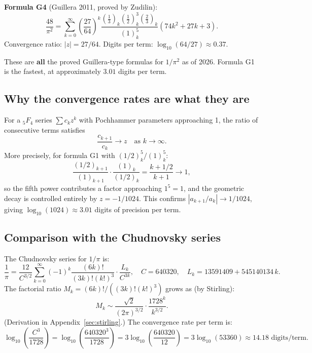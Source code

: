 \documentclass[11pt]{article}
\begin{document}
\medskip

\noindent\textbf{Formula G4} (Guillera 2011, proved by Zudilin):
\begin{equation}\label{eq:G4}
\frac{48}{\pi^2} = \sum_{k=0}^{\infty} \left(\frac{27}{64}\right)^k \frac{(\tfrac{1}{3})_k(\tfrac{1}{2})_k^3(\tfrac{2}{3})_k}{(1)_k^5} \left(74k^2 + 27k + 3\right).
\end{equation}
Convergence ratio: $|z| = 27/64$. Digits per term: $\log_{10}(64/27) \approx \mathbf{0.37}$.

\medskip

These are \textbf{all} the proved Guillera-type formulas for $1/\pi^2$ as of 2026. Formula G1 is the fastest, at approximately $3.01$ digits per term.

\subsection{Why the convergence rates are what they are}

For a ${}_5F_4$ series $\sum c_k z^k$ with Pochhammer parameters approaching 1, the ratio of consecutive terms satisfies
\[
\frac{c_{k+1}}{c_k} \to z \quad \text{as } k \to \infty.
\]
More precisely, for formula G1 with $(1/2)_k^5 / (1)_k^5$:
\[
\frac{(1/2)_{k+1}}{(1)_{k+1}} \cdot \frac{(1)_k}{(1/2)_k} = \frac{k+1/2}{k+1} \to 1,
\]
so the fifth power contributes a factor approaching $1^5 = 1$, and the geometric decay is controlled entirely by $z = -1/1024$. This confirms $|a_{k+1}/a_k| \to 1/1024$, giving $\log_{10}(1024) \approx 3.01$ digits of precision per term.

\subsection{Comparison with the Chudnovsky series}

The Chudnovsky series for $1/\pi$ is:
\begin{equation}\label{eq:chud}
\frac{1}{\pi} = \frac{12}{C^{3/2}} \sum_{k=0}^{\infty} (-1)^k \frac{(6k)!}{(3k)!(k!)^3} \cdot \frac{L_k}{C^{3k}}, \quad C = 640320, \quad L_k = 13591409 + 545140134\,k.
\end{equation}
The factorial ratio $M_k = (6k)!/((3k)!(k!)^3)$ grows as (by Stirling):
\begin{equation}\label{eq:Mk-growth}
M_k \sim \frac{\sqrt{2}}{(2\pi)^{3/2}} \cdot \frac{1728^k}{k^{3/2}}.
\end{equation}
(Derivation in Appendix~\ref{sec:stirling}.) The convergence rate per term is:
\[
\log_{10}\!\left(\frac{C^3}{1728}\right) = \log_{10}\!\left(\frac{640320^3}{1728}\right) = 3\log_{10}\!\left(\frac{640320}{12}\right) = 3\log_{10}(53360) \approx 14.18 \text{ digits/term}.
\]
\end{document}

